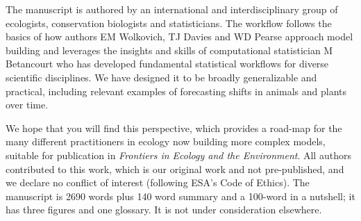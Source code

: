 \documentclass[11pt]{article}
\begin{document}

The manuscript is authored by an international and interdisciplinary group of ecologists, conservation biologists and statisticians. The workflow follows the basics of how authors EM Wolkovich, TJ Davies and WD Pearse approach model building and leverages the insights and skills of computational statistician M Betancourt who has developed fundamental statistical workflows for diverse scientific disciplines. We have designed it to be broadly generalizable and practical, including relevant examples of forecasting shifts in animals and plants over time.

We hope that you will find this perspective, which provides a road-map for the many different practitioners in ecology now building more complex models, suitable for publication in \emph{Frontiers in Ecology and the Environment}. %
All authors contributed to this work, which is our original work and not pre-published, and we declare no conflict of interest (following ESA's Code of Ethics). The manuscript is 2690 words plus 140 word summary and a 100-word in a nutshell; it has three figures and one glossary. It is not under consideration elsewhere.  %
\end{document}
